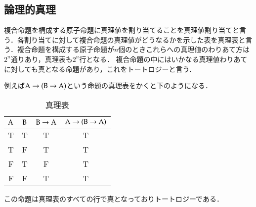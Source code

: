 \documentclass[10pt,b5paper,papersize,dvipdfmx]{jsbook}
\begin{document}
\subsection{論理的真理}
複合命題を構成する原子命題に真理値を割り当てることを真理値割り当てと言う．各割り当てに対して複合命題の真理値がどうなるかを示した表を真理表と言う．複合命題を構成する原子命題が$n$個のときこれらへの真理値のわりあて方は$2^n$通りあり，真理表も$2^n$行となる．
複合命題の中にはいかなる真理値わりあてに対しても真となる命題があり，これをトートロジーと言う．\par
例えば$\rmA \to (\rmB \to \rmA)$という命題の真理表をかくと下のようになる．
\begin{table}[H]
  \centering
  \caption{真理表}
  \begin{tabular}{cc|cc}\hline
    $\mathrm{A}$ & $\mathrm{B}$ & $\rmB \to \rmA$ &$\rmA \to (\rmB \to \rmA)$ \\ \hline
    T & T & T & T \\
    T & F & T & T \\
    F & T & F & T \\
    F & F & T & T \\ \hline
  \end{tabular}
\end{table}
この命題は真理表のすべての行で真となっておりトートロジーである．
\end{document}
